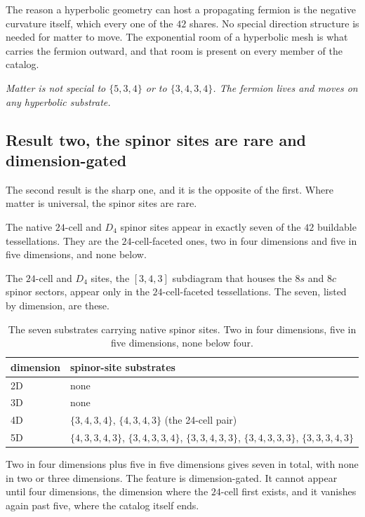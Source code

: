 The reason a hyperbolic geometry can host a propagating fermion is the negative curvature itself, which every one of the $42$ shares. No special direction structure is needed for matter to move. The exponential room of a hyperbolic mesh is what carries the fermion outward, and that room is present on every member of the catalog.

\emph{Matter is not special to $\{5,3,4\}$ or to $\{3,4,3,4\}$. The fermion lives and moves on any hyperbolic substrate.}

\subsection{Result two, the spinor sites are rare and dimension-gated}

The second result is the sharp one, and it is the opposite of the first. Where matter is universal, the spinor sites are rare.

\begin{result}
The native $24$-cell and $D_4$ spinor sites appear in exactly seven of the $42$ buildable tessellations. They are the $24$-cell-faceted ones, two in four dimensions and five in five dimensions, and none below.
\end{result}

The $24$-cell and $D_4$ sites, the $[3,4,3]$ subdiagram that houses the $8s$ and $8c$ spinor sectors, appear only in the $24$-cell-faceted tessellations. The seven, listed by dimension, are these.

\begin{table}[ht]
\centering
\begin{tabular}{@{}ll@{}}
\toprule
dimension & spinor-site substrates \\
\midrule
2D & none \\
3D & none \\
4D & $\{3,4,3,4\}$, $\{4,3,4,3\}$ (the 24-cell pair) \\
5D & $\{4,3,3,4,3\}$, $\{3,4,3,3,4\}$, $\{3,3,4,3,3\}$, $\{3,4,3,3,3\}$, $\{3,3,3,4,3\}$ \\
\bottomrule
\end{tabular}
\caption{The seven substrates carrying native spinor sites. Two in four dimensions, five in five dimensions, none below four.}
\label{tab:spinor-sites}
\end{table}

Two in four dimensions plus five in five dimensions gives seven in total, with none in two or three dimensions. The feature is dimension-gated. It cannot appear until four dimensions, the dimension where the $24$-cell first exists, and it vanishes again past five, where the catalog itself ends.


